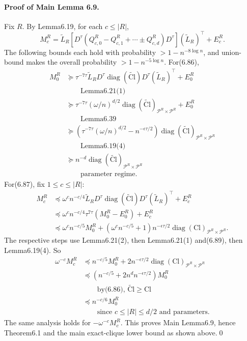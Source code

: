 \documentclass[10pt,a4paper]{article}
\begin{document}
\paragraph{Proof of Main Lemma 6.9.} Fix $R$. By Lemma6.19, for each $c\le|R|$,
\[M_c^R=\widetilde L_R[D^\tau(Q_{c,0}^R-Q_{c,1}^R+\cdots\pm Q_{c,d}^R)D^\tau](\widetilde L_R)^\top+E_c^R.\tag{6.89}\]
The following bounds each hold with probability $>1-n^{-8\log n}$, and union-bound makes the overall probability $>1-n^{-5\log n}$.
For(6.86),
\begin{align*}M_0^R&\succeq\tau^{-7\tau}\widetilde L_RD^\tau\operatorname{diag}(\widetilde{\mathrm{Cl}})D^\tau(\widetilde L_R)^\top+E_0^R\\&\qquad\text{Lemma6.21(1)}\\&\succeq\tau^{-7\tau}(\omega/n)^{d/2}\operatorname{diag}(\widetilde{\mathrm{Cl}})_{\mathcal P^R\times\mathcal P^R}+E_0^R\\&\qquad\text{Lemma6.39}\\&\succeq(\tau^{-7\tau}(\omega/n)^{d/2}-n^{-\epsilon\tau/2})\operatorname{diag}(\widetilde{\mathrm{Cl}})_{\mathcal P^R\times\mathcal P^R}\\&\qquad\text{Lemma6.19(4)}\\&\succeq n^{-d}\operatorname{diag}(\widetilde{\mathrm{Cl}})_{\mathcal P^R\times\mathcal P^R}\\&\qquad\text{parameter regime}.\end{align*}
For(6.87), fix $1\le c\le|R|$:
\begin{align*}M_c^R&\preceq\omega^cn^{-c/4}\widetilde L_RD^\tau\operatorname{diag}(\widetilde{\mathrm{Cl}})D^\tau(\widetilde L_R)^\top+E_c^R\\&\preceq\omega^cn^{-c/4}\tau^{7\tau}(M_0^R-E_0^R)+E_c^R\\&\preceq\omega^cn^{-c/5}M_0^R+(\omega^cn^{-c/5}+1)n^{-\epsilon\tau/2}\operatorname{diag}(\mathrm{Cl})_{\mathcal P^R\times\mathcal P^R}.\end{align*}
The respective steps use Lemma6.21(2), then Lemma6.21(1) and(6.89), then Lemma6.19(4). So
\begin{align*}\omega^{-c}M_c^R&\preceq n^{-c/5}M_0^R+2n^{-\epsilon\tau/2}\operatorname{diag}(\mathrm{Cl})_{\mathcal P^R\times\mathcal P^R}\\&\preceq(n^{-c/5}+2n^dn^{-\epsilon\tau/2})M_0^R\\&\qquad\text{by(6.86), }\widetilde{\mathrm{Cl}}\ge\mathrm{Cl}\\&\preceq n^{-c/6}M_0^R\\&\qquad\text{since }c\le|R|\le d/2\text{ and parameters}.\end{align*}
The same analysis holds for $-\omega^{-c}M_c^R$. This proves Main Lemma6.9, hence Theorem6.1 and the main exact-clique lower bound as shown above.\qed
\end{document}

